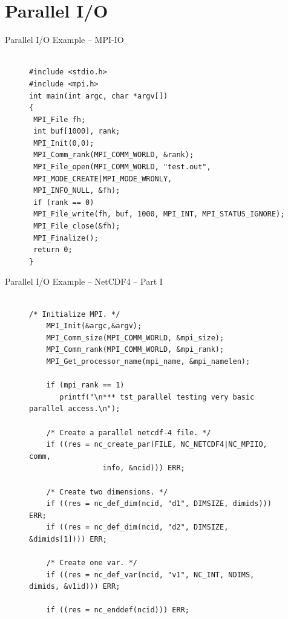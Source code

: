 \documentclass[compress,11pt,xcolor=svgnames,aspectratio=169]{beamer}
\begin{document}
\section{Parallel I/O}

\begin{frame}[fragile]{Parallel I/O Example -- MPI-IO}

\begin{figure}
\centering
\begin{varwidth}{\linewidth}
{ \tiny

\begin{verbatim}

#include <stdio.h>
#include <mpi.h>
int main(int argc, char *argv[])
{
 MPI_File fh;
 int buf[1000], rank;
 MPI_Init(0,0);
 MPI_Comm_rank(MPI_COMM_WORLD, &rank);
 MPI_File_open(MPI_COMM_WORLD, "test.out",
 MPI_MODE_CREATE|MPI_MODE_WRONLY,
 MPI_INFO_NULL, &fh);
 if (rank == 0)
 MPI_File_write(fh, buf, 1000, MPI_INT, MPI_STATUS_IGNORE);
 MPI_File_close(&fh);
 MPI_Finalize();
 return 0;
}

\end{verbatim}

}
\end{varwidth}
\end{figure}

\end{frame}

\begin{frame}[fragile]{Parallel I/O Example -- NetCDF4 -- Part I}

\begin{figure}
\centering
\begin{varwidth}{\linewidth}
{ \tiny

\begin{verbatim}

/* Initialize MPI. */
    MPI_Init(&argc,&argv);
    MPI_Comm_size(MPI_COMM_WORLD, &mpi_size);
    MPI_Comm_rank(MPI_COMM_WORLD, &mpi_rank);
    MPI_Get_processor_name(mpi_name, &mpi_namelen);

    if (mpi_rank == 1)
       printf("\n*** tst_parallel testing very basic parallel access.\n");

    /* Create a parallel netcdf-4 file. */
    if ((res = nc_create_par(FILE, NC_NETCDF4|NC_MPIIO, comm,
			     info, &ncid))) ERR;

    /* Create two dimensions. */
    if ((res = nc_def_dim(ncid, "d1", DIMSIZE, dimids))) ERR;
    if ((res = nc_def_dim(ncid, "d2", DIMSIZE, &dimids[1]))) ERR;

    /* Create one var. */
    if ((res = nc_def_var(ncid, "v1", NC_INT, NDIMS, dimids, &v1id))) ERR;

    if ((res = nc_enddef(ncid))) ERR;

\end{verbatim}

}
\end{varwidth}
\end{figure}

\end{frame}
\end{document}
